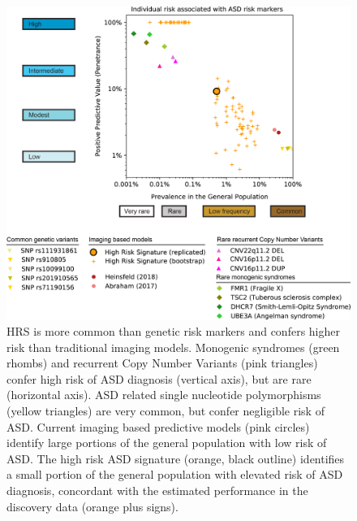\documentclass[9pt,lineno]{elife}
\begin{document}
\begin{figure}
\includegraphics[width=\linewidth]{fig2_model}
    \caption{HRS is more common than genetic risk markers and confers higher risk than traditional imaging models. Monogenic syndromes (green rhombs) and recurrent Copy Number Variants (pink triangles) confer high risk of ASD diagnosis (vertical axis), but are rare (horizontal axis). ASD related single nucleotide polymorphisms (yellow triangles) are very common, but confer negligible risk of ASD. Current imaging based predictive models (pink circles) identify large portions of the general population with low risk of ASD. The high risk ASD signature (orange, black outline) identifies a small portion of the general population with elevated risk of ASD diagnosis, concordant with the estimated performance in the discovery data (orange plus signs).}
\label{fig:2_model}
\end{figure}
\end{document}
